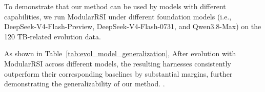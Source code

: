 \documentclass{article} %
\begin{document}
\begin{table}
\vspace{-8pt}
\centering
\footnotesize
\setlength{\tabcolsep}{4pt}

\caption{Generalization across different evolution models to run ModularRSI on TB 2.0.}
\label{tab:evol_model_generalization}


\vspace{-8pt}
\end{table}




To demonstrate that our method can be used by models with different capabilities, we run ModularRSI under different foundation models (i.e., DeepSeek-V4-Flash-Preview, DeepSeek-V4-Flash-0731, and Qwen3.8-Max) on the 120 TB-related evolution data.

As shown in Table~\ref{tab:evol_model_generalization}, After evolution with ModularRSI across different models, the resulting harnesses consistently outperform their corresponding baselines by substantial margins, further demonstrating the generalizability of our method.
.
\end{document}
